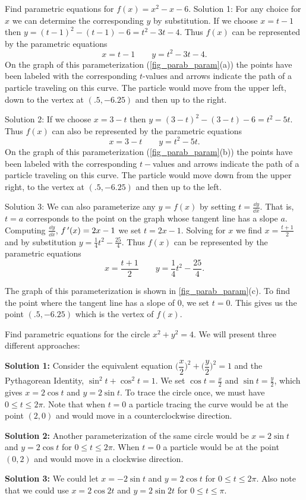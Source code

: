 \begin{example}\label{ex_pareq5}%
Find parametric equations for $f(x)=x^2-x-6$.
\solution
Solution 1: For any choice for $x$ we can determine the corresponding $y$ by substitution. If we choose $x=t-1$ then $y=(t-1)^2-(t-1)-6=t^2-3t-4$. Thus $f(x)$ can be represented by the parametric equations
\[x=t-1 \qquad y=t^2-3t-4.\]
On the graph of this parameterization (\autoref{fig_parab_param}(a)) the points have been labeled with the corresponding $t$-values and arrows indicate the path of a particle traveling on this curve. The particle would move from the upper left, down to the vertex at $(.5,-6.25)$ and then up to the right.

Solution 2: If we choose $x=3-t$ then $y=(3-t)^2-(3-t)-6=t^2-5t$. Thus $f(x)$ can also be represented by the parametric equations
\[x=3-t \qquad y=t^2-5t.\]
On the graph of this parameterization (\autoref{fig_parab_param}(b)) the points have been labeled with the corresponding $t-$values and arrows indicate the path of a particle traveling on this curve. The particle would move down from the upper right, to the vertex at $(.5,-6.25)$ and then up to the left.

Solution 3: We can also parameterize any $y=f(x)$ by setting $t=\frac{\dd y}{\dd x}$. That is, $t=a$ corresponds to the point on the graph whose tangent line has a slope $a$. Computing $\frac{\dd y}{\dd x}$, $f\,'(x) = 2x-1$ we set $t=2x-1$. Solving for $x$ we find $x=\frac{t+1}{2}$ and by substitution $y=\frac{1}{4}t^2 - \frac{25}{4}$. Thus $f(x)$ can be represented by the parametric equations
\[x=\frac{t+1}{2} \qquad y=\frac{1}{4}t^2 - \frac{25}{4}.\]

The graph of this parameterization is shown in \autoref{fig_parab_param}(c). To find the point where the tangent line has a slope of $0$, we set $t=0$. This gives us the point $(.5, -6.25)$ which is the vertex of $f(x)$.
\end{example}

\begin{example}\label{ex_par_circle}%
Find parametric equations for the circle $x^2+y^2=4$.
\solution
We will present three different approaches:

\textbf{Solution 1:} Consider the equivalent equation $\biggl(\dfrac{x}{2}\biggr)^2+ \biggl(\dfrac{y}{2}\biggr)^2=1$ and the Pythagorean Identity, $\sin^2t+\cos^2 t=1$. We set $\cos t=\frac{x}{2}$ and $\sin t=\frac{y}{2}$, which gives $x=2\cos t$ and $y=2\sin t$. To trace the circle once, we must have $0\leq t \leq 2\pi$. Note that when $t=0$ a particle tracing the curve would be at the point $(2,0)$ and would move in a counterclockwise direction.

\textbf{Solution 2:} Another parameterization of the same circle would be $x=2\sin t$ and $y=2\cos t$ for $0\leq t \leq 2\pi$. When $t=0$ a particle would be at the point $(0,2)$ and would move in a clockwise direction.

\textbf{Solution 3:} We could let $x=-2\sin t$ and $y=2\cos t$ for $0\leq t \leq 2\pi$. Also note that we could use $x=2\cos 2t$ and $y=2\sin 2t$ for $0\leq t \leq \pi$.
\end{example}

